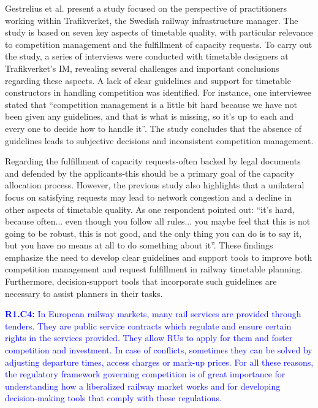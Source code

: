 \documentclass[preprint,12pt]{elsarticle}
\begin{document}
Gestrelius et al. \cite{Gestrelius2020} present a study focused on the perspective of practitioners working within Trafikverket, the Swedish railway infrastructure manager.  The study is based on seven key aspects of timetable quality, with particular relevance to competition management and the fulfillment of capacity requests. To carry out the study, a series of interviews were conducted with timetable designers at Trafikverket’s \gls{IM}, revealing several challenges and important conclusions regarding these aspects. A lack of clear guidelines and support for timetable constructors in handling competition was identified. For instance, one interviewee stated that ``competition management is a little bit hard because we have not been given any guidelines, and that is what is missing, so it’s up to each and every one to decide how to handle it''. The study concludes that the absence of guidelines leads to subjective decisions and inconsistent competition management. 

Regarding the fulfillment of capacity requests-often backed by legal documents and defended by the applicants-this should be a primary goal of the capacity allocation process. However, the previous study also highlights that a unilateral focus on satisfying requests may lead to network congestion and a decline in other aspects of timetable quality. As one respondent pointed out: ``it’s hard, because often... even though you follow all rules... you maybe feel that this is not going to be robust, this is not good, and the only thing you can do is to say it, but you have no means at all to do something about it''. These findings emphasize the need to develop clear guidelines and support tools to improve both competition management and request fulfillment in railway timetable planning. Furthermore, decision-support tools that incorporate such guidelines are necessary to assist planners in their tasks.

\textcolor{blue}{\textbf{R1.C4:} In European railway markets, many rail services are provided through tenders. They are public service contracts which regulate and ensure certain rights in the services provided. They allow \glspl{RU} to apply for them and foster competition and investment. In case of conflicts, sometimes they can be solved by adjusting departure times, access charges or mark-up prices. For all these reasons, the regulatory framework governing competition is of great importance for understanding how a liberalized railway market works and for developing decision-making tools that comply with these regulations.}
\end{document}
